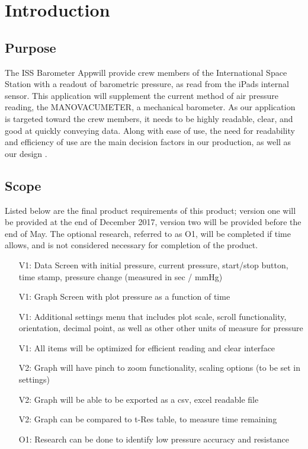 \documentclass[onecolumn, draftclsnofoot,10pt, compsoc]{IEEEtran}
\def \CapstoneProjectName{ISS Barometer App}
\begin{document}
\section{Introduction}
\subsection{Purpose}
The \CapstoneProjectName will provide crew members of the International Space Station with a readout of barometric pressure, as read from the iPads internal sensor.
This application will supplement the current method of air pressure reading, the MANOVACUMETER, a mechanical barometer.
As our application is targeted toward the crew members, it needs to be highly readable, clear, and good at quickly conveying data.
Along with ease of use, the need for readability and efficiency of use are the main decision factors in our production, as well as our design \cite{probStat}.

\subsection{Scope}
Listed below are the final product requirements of this product; version one will be provided at the end of December 2017, version two will be provided before the end of May.
The optional research, referred to as O1, will be completed if time allows, and is not considered necessary for completion of the product.

\begin{itemize}
\item[V1:] Data Screen with initial pressure, current pressure, start/stop button, time stamp, pressure change (measured in sec / mmHg)
\item[V1:] Graph Screen with plot pressure as a function of time
\item[V1:] Additional settings menu that includes plot scale, scroll functionality, orientation, decimal point, as well as other other units of measure for pressure
\item[V1:] All items will be optimized for efficient reading and clear interface
\item[V2:] Graph will have pinch to zoom functionality, scaling options (to be set in settings)
\item[V2:] Graph will be able to be exported as a csv, excel readable file
\item[V2:] Graph can be compared to t-Res table, to measure time remaining
\item[O1:] Research can be done to identify low pressure accuracy and resistance
\end{itemize}
\end{document}
